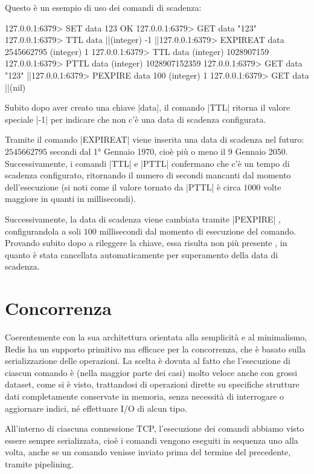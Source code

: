 Questo è un esempio di uso dei comandi di scadenza:

\begin{commentedsource}[style=redis]
127.0.0.1:6379> SET data 123
OK
127.0.0.1:6379> GET data
"123"
127.0.0.1:6379> TTL data
|\lnote|(integer) -1
|\lnote|127.0.0.1:6379> EXPIREAT data 2545662795
(integer) 1
127.0.0.1:6379> TTL data
(integer) 1028907159
127.0.0.1:6379> PTTL data
(integer) 1028907152359
127.0.0.1:6379> GET data
"123"
|\lnote|127.0.0.1:6379> PEXPIRE data 100
(integer) 1
127.0.0.1:6379> GET data
|\lnote|(nil)
\end{commentedsource}

Subito dopo aver creato una chiave \cverb|data|, il comando \cverb|TTL| ritorna il valore speciale
\cverb|-1|  per indicare che non c'è una data di scadenza configurata. 

Tramite il comando \cverb|EXPIREAT|  viene inserita una data di scadenza nel futuro:
$\num{2545662795}$ secondi dal 1° Gennaio 1970, cioè più o meno il 9 Gennaio 2050. Successivamente,
i comandi \cverb|TTL| e \cverb|PTTL| confermano che c'è un tempo di scadenza configurato, ritornando
il numero di secondi mancanti dal momento dell'esecuzione (si noti come il valore tornato da
\cverb|PTTL| è circa $1000$ volte maggiore in quanti in millisecondi).

Successivamente, la data di scadenza viene cambiata tramite \cverb|PEXPIRE| ,
configurandola a soli $\num{100}$ millisecondi dal momento di esecuzione del comando. Provando
subito dopo a rileggere la chiave, essa risulta non più presente , in quanto è stata
cancellata automaticamente per superamento della data di scadenza.

\section{Concorrenza}
\label{sec:concurrency}

Coerentemente con la sua architettura orientata alla semplicità e al minimalismo, Redis ha un
supporto primitivo ma efficace per la concorrenza, che è basato sulla serializzazione delle
operazioni. La scelta è dovuta al fatto che l'esecuzione di ciascun comando è (nella maggior parte
dei casi) molto veloce anche con grossi dataset, come si è visto, trattandosi di operazioni dirette
su specifiche strutture dati completamente conservate in memoria, senza necessità di interrogare o
aggiornare indici, né effettuare I/O di alcun tipo.

All'interno di ciascuna connessione TCP, l'esecuzione dei comandi abbiamo visto essere sempre
serializzata, cioè i comandi vengono eseguiti in sequenza uno alla volta, anche se un comando
venisse inviato prima del termine del precedente, tramite pipelining.

